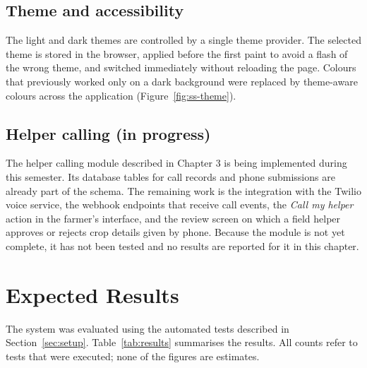 
\subsection*{Theme and accessibility}
The light and dark themes are controlled by a single theme provider. The selected theme is stored in the browser, applied before the first paint to avoid a flash of the wrong theme, and switched immediately without reloading the page. Colours that previously worked only on a dark background were replaced by theme-aware colours across the application (Figure~\ref{fig:ss-theme}).


\subsection*{Helper calling (in progress)}
The helper calling module described in Chapter 3 is being implemented during this semester. Its database tables for call records and phone submissions are already part of the schema. The remaining work is the integration with the Twilio voice service, the webhook endpoints that receive call events, the \textit{Call my helper} action in the farmer's interface, and the review screen on which a field helper approves or rejects crop details given by phone. Because the module is not yet complete, it has not been tested and no results are reported for it in this chapter.

\section{Expected Results}
The system was evaluated using the automated tests described in Section~\ref{sec:setup}. Table~\ref{tab:results} summarises the results. All counts refer to tests that were executed; none of the figures are estimates.

